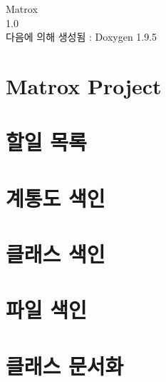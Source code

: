 \documentclass[twoside]{book}
\newcommand{\+}{\discretionary{\mbox{\scriptsize$\hookleftarrow$}}{}{}}
\newcommand{\clearemptydoublepage}{%
    \newpage{\pagestyle{empty}\cleardoublepage}%
  }
\begin{document}
  \raggedbottom
    \hypersetup{pageanchor=false,
                bookmarksnumbered=true,
                pdfencoding=unicode
               }
  \begin{titlepage}
  \vspace*{7cm}
  \begin{center}%
  {\Large Matrox}\\
  [1ex]\large 1.\+0 \\
  \vspace*{1cm}
  {\large 다음에 의해 생성됨 \+:  Doxygen 1.9.5}\\
  \end{center}
  \end{titlepage}
  \clearemptydoublepage
  \tableofcontents
  \clearemptydoublepage
  \hypersetup{pageanchor=true}
\chapter{Matrox Project}
\label{index}\hypertarget{index}{}
\chapter{할일 목록}
\label{todo}

\chapter{계통도 색인}

\chapter{클래스 색인}

\chapter{파일 색인}

\chapter{클래스 문서화}
























\end{document}
